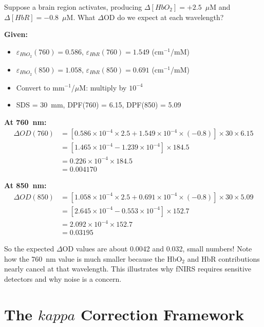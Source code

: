 \documentclass[12pt]{article}
\def\kappa{kappa}%
\def\text#1{#1}%
\begin{document}
\begin{workexample}
Suppose a brain region activates, producing $\Delta[\text{HbO}_2] = +2.5$~$\mu$M and $\Delta[\text{HbR}] = -0.8$~$\mu$M. What $\Delta$OD do we expect at each wavelength?

\textbf{Given:}
\begin{itemize}
\item $\varepsilon_{\text{HbO}_2}(760) = 0.586$, $\varepsilon_{\text{HbR}}(760) = 1.549$ (cm$^{-1}$/mM)
\item $\varepsilon_{\text{HbO}_2}(850) = 1.058$, $\varepsilon_{\text{HbR}}(850) = 0.691$ (cm$^{-1}$/mM)
\item Convert to mm$^{-1}$/$\mu$M: multiply by $10^{-4}$
\item SDS = 30~mm, DPF(760) = 6.15, DPF(850) = 5.09
\end{itemize}

\textbf{At 760~nm:}
\begin{align}
\Delta\text{OD}(760) &= [0.586 \times 10^{-4} \times 2.5 + 1.549 \times 10^{-4} \times (-0.8)] \times 30 \times 6.15 \\
&= [1.465 \times 10^{-4} - 1.239 \times 10^{-4}] \times 184.5 \\
&= 0.226 \times 10^{-4} \times 184.5 \\
&= 0.004170
\end{align}

\textbf{At 850~nm:}
\begin{align}
\Delta\text{OD}(850) &= [1.058 \times 10^{-4} \times 2.5 + 0.691 \times 10^{-4} \times (-0.8)] \times 30 \times 5.09 \\
&= [2.645 \times 10^{-4} - 0.553 \times 10^{-4}] \times 152.7 \\
&= 2.092 \times 10^{-4} \times 152.7 \\
&= 0.03195
\end{align}

So the expected $\Delta$OD values are about 0.0042 and 0.032, small numbers! Note how the 760~nm value is much smaller because the HbO$_2$ and HbR contributions nearly cancel at that wavelength. This illustrates why fNIRS requires sensitive detectors and why noise is a concern.
\end{workexample}

\newpage
\part{The \texorpdfstring{$\kappa$}{kappa} Correction Framework}
\end{document}
